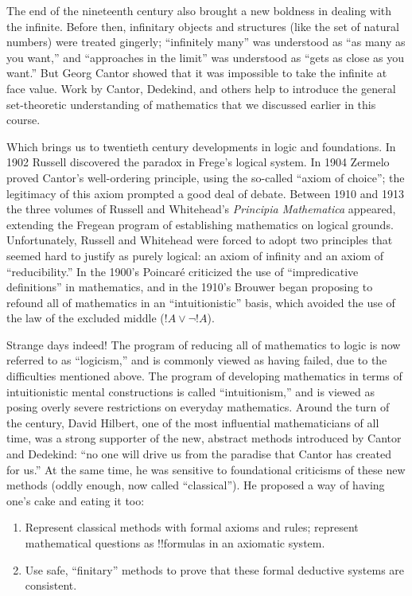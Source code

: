 \documentclass[../../../include/open-logic-section]{subfiles}
\begin{document}
The end of the nineteenth century also brought a new boldness in dealing
with the infinite. Before then, infinitary objects and structures
(like the set of natural numbers) were treated gingerly; ``infinitely
many'' was understood as ``as many as you want,'' and ``approaches in
the limit'' was understood as ``gets as close as you want.'' But Georg
Cantor showed that it was impossible to take the infinite at face
value. Work by Cantor, Dedekind, and others help to introduce the
general set-theoretic understanding of mathematics that we discussed
earlier in this course.

Which brings us to twentieth century developments in logic and foundations.
In 1902 Russell discovered the paradox in Frege's logical system. In
1904 Zermelo proved Cantor's well-ordering principle, using the
so-called ``axiom of choice''; the legitimacy of this axiom prompted a
good deal of debate. Between 1910 and 1913 the three volumes of
Russell and Whitehead's \emph{Principia Mathematica} appeared,
extending the Fregean program of establishing mathematics on logical
grounds. Unfortunately, Russell and Whitehead were forced to adopt two
principles that seemed hard to justify as purely logical: an axiom of
infinity and an axiom of ``reducibility.'' In the 1900's Poincar\'e
criticized the use of ``impredicative definitions'' in mathematics,
and in the 1910's Brouwer began proposing to refound all of
mathematics in an ``intuitionistic'' basis, which avoided the use of
the law of the excluded middle ($!A \lor \lnot !A$).

Strange days indeed!{} The program of reducing all of mathematics to
logic is now referred to as ``logicism,'' and is commonly viewed as
having failed, due to the difficulties mentioned above. The program of
developing mathematics in terms of intuitionistic mental constructions
is called ``intuitionism,'' and is viewed as posing overly severe
restrictions on everyday mathematics. Around the turn of the century,
David Hilbert, one of the most influential mathematicians of all time,
was a strong supporter of the new, abstract methods introduced by
Cantor and Dedekind: ``no one will drive us from the paradise that
Cantor has created for us.'' At the same time, he was sensitive to
foundational criticisms of these new methods (oddly enough, now called
``classical''). He proposed a way of having one's cake and eating it
too:
\begin{enumerate}
\item Represent classical methods with formal axioms and rules;
  represent mathematical questions as !!{formula}s in an axiomatic
  system.
\item Use safe, ``finitary'' methods to prove that these formal
  deductive systems are consistent.
\end{enumerate}
\end{document}
